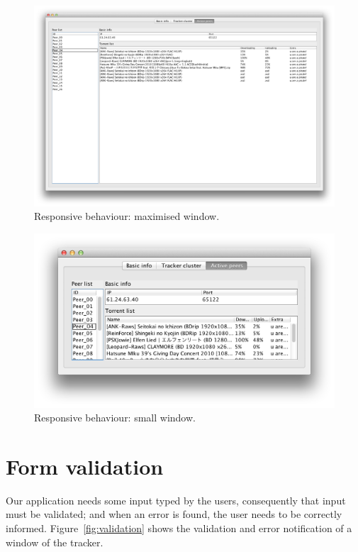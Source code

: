 \documentclass[twoside,a4paper,10pt]{article}
\begin{document}
\begin{figure}[h]
  \centering
  \includegraphics[width=\textwidth]{imgs/responsive_design_maximized.png}
  \caption{\label{fig:resp-maxi}Responsive behaviour: maximised window.}
\end{figure}

\begin{figure}[h]
  \centering
  \includegraphics[width=\textwidth]{imgs/responsive_design.png}
  \caption{\label{fig:resp-small}Responsive behaviour: small window.}
\end{figure}

\section{Form validation}

Our application needs some input typed by the users, consequently that input
must be validated; and when an error is found, the user needs to be correctly
informed. Figure~\ref{fig:validation}
shows the validation and error notification of a window of the tracker.
\end{document}
